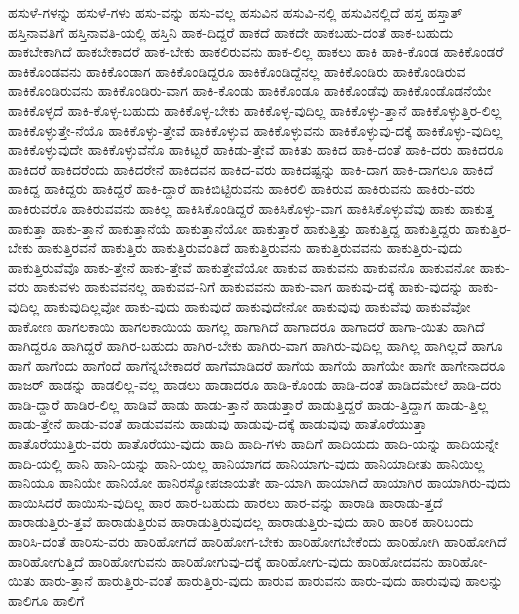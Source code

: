 {ಹಸುಳೆ-ಗಳನ್ನು
ಹಸುಳೆ-ಗಳು
ಹಸು-ವನ್ನು
ಹಸು-ವಲ್ಲ
ಹಸುವಿನ
ಹಸುವಿ-ನಲ್ಲಿ
ಹಸುವಿನಲ್ಲಿದೆ
ಹಸ್ತ
ಹಸ್ತಾತ್
ಹಸ್ತಿನಾವತಿಗೆ
ಹಸ್ತಿನಾವತಿ-ಯಲ್ಲಿ
ಹಸ್ತಿನಿ
ಹಾಕ-ದಿದ್ದರೆ
ಹಾಕದೆ
ಹಾಕದೇ
ಹಾಕಬಹು-ದಂತೆ
ಹಾಕ-ಬಹುದು
ಹಾಕಬೇಕಾಗಿದೆ
ಹಾಕಬೇಕಾದರೆ
ಹಾಕ-ಬೇಕು
ಹಾಕಲಿರುವನು
ಹಾಕ-ಲಿಲ್ಲ
ಹಾಕಲು
ಹಾಕಿ
ಹಾಕಿ-ಕೊಂಡ
ಹಾಕಿಕೊಂಡರೆ
ಹಾಕಿಕೊಂಡವನು
ಹಾಕಿಕೊಂಡಾಗ
ಹಾಕಿಕೊಂಡಿದ್ದರೂ
ಹಾಕಿಕೊಂಡಿದ್ದೆನಲ್ಲ
ಹಾಕಿಕೊಂಡಿರು
ಹಾಕಿಕೊಂಡಿರುವ
ಹಾಕಿಕೊಂಡಿರುವನು
ಹಾಕಿಕೊಂಡಿರು-ವಾಗ
ಹಾಕಿ-ಕೊಂಡು
ಹಾಕಿಕೊಂಡೂ
ಹಾಕಿಕೊಂಡೆವು
ಹಾಕಿಕೊಂಡೊಡನೆಯೇ
ಹಾಕಿಕೊಳ್ಳದೆ
ಹಾಕಿ-ಕೊಳ್ಳ-ಬಹುದು
ಹಾಕಿಕೊಳ್ಳ-ಬೇಕು
ಹಾಕಿಕೊಳ್ಳ-ವುದಿಲ್ಲ
ಹಾಕಿಕೊಳ್ಳು-ತ್ತಾನೆ
ಹಾಕಿಕೊಳ್ಳುತ್ತಿರ-ಲಿಲ್ಲ
ಹಾಕಿಕೊಳ್ಳುತ್ತೇ-ನೆಯೊ
ಹಾಕಿಕೊಳ್ಳು-ತ್ತೇವೆ
ಹಾಕಿಕೊಳ್ಳುವ
ಹಾಕಿಕೊಳ್ಳುವನು
ಹಾಕಿಕೊಳ್ಳುವು-ದಕ್ಕೆ
ಹಾಕಿಕೊಳ್ಳು-ವುದಿಲ್ಲ
ಹಾಕಿಕೊಳ್ಳುವುದೇ
ಹಾಕಿಕೊಳ್ಳುವೆನೊ
ಹಾಕಿಟ್ಟರೆ
ಹಾಕಿಡು-ತ್ತೇವೆ
ಹಾಕಿತು
ಹಾಕಿದ
ಹಾಕಿ-ದಂತೆ
ಹಾಕಿ-ದರು
ಹಾಕಿದರೂ
ಹಾಕಿದರೆ
ಹಾಕಿದರೆಂದು
ಹಾಕಿದರೇನೆ
ಹಾಕಿದವನ
ಹಾಕಿದ-ವರು
ಹಾಕಿದಷ್ಟನ್ನು
ಹಾಕಿ-ದಾಗ
ಹಾಕಿ-ದಾಗಲೂ
ಹಾಕಿದೆ
ಹಾಕಿದ್ದ
ಹಾಕಿದ್ದರು
ಹಾಕಿದ್ದರೆ
ಹಾಕಿ-ದ್ದಾರೆ
ಹಾಕಿಬಿಟ್ಟಿರುವನು
ಹಾಕಿರಲಿ
ಹಾಕಿರುವ
ಹಾಕಿರುವನು
ಹಾಕಿರು-ವರು
ಹಾಕಿರುವರೊ
ಹಾಕಿರುವವನು
ಹಾಕಿಲ್ಲ
ಹಾಕಿಸಿಕೊಂಡಿದ್ದರೆ
ಹಾಕಿಸಿಕೊಳ್ಳು-ವಾಗ
ಹಾಕಿಸಿಕೊಳ್ಳುವೆವು
ಹಾಕು
ಹಾಕುತ್ತ
ಹಾಕುತ್ತಾ
ಹಾಕು-ತ್ತಾನೆ
ಹಾಕುತ್ತಾನೆಯೆ
ಹಾಕುತ್ತಾನೆಯೋ
ಹಾಕುತ್ತಾರೆ
ಹಾಕುತ್ತಿತ್ತು
ಹಾಕುತ್ತಿದ್ದ
ಹಾಕುತ್ತಿದ್ದರು
ಹಾಕುತ್ತಿರ-ಬೇಕು
ಹಾಕುತ್ತಿರವನೆ
ಹಾಕುತ್ತಿರು
ಹಾಕುತ್ತಿರುವಂತಿದೆ
ಹಾಕುತ್ತಿರುವನು
ಹಾಕುತ್ತಿರುವವನು
ಹಾಕುತ್ತಿರು-ವುದು
ಹಾಕುತ್ತಿರುವೆವೊ
ಹಾಕು-ತ್ತೇನೆ
ಹಾಕು-ತ್ತೇವೆ
ಹಾಕುತ್ತೇವೆಯೋ
ಹಾಕುವ
ಹಾಕುವನು
ಹಾಕುವನೊ
ಹಾಕುವನೋ
ಹಾಕು-ವರು
ಹಾಕುವಳು
ಹಾಕುವವನಲ್ಲ
ಹಾಕುವವ-ನಿಗೆ
ಹಾಕುವವನು
ಹಾಕು-ವಾಗ
ಹಾಕುವು-ದಕ್ಕೆ
ಹಾಕು-ವುದನ್ನು
ಹಾಕು-ವುದಿಲ್ಲ
ಹಾಕುವುದಿಲ್ಲವೋ
ಹಾಕು-ವುದು
ಹಾಕುವುದೆ
ಹಾಕುವುದೇನೋ
ಹಾಕುವುವು
ಹಾಕುವೆವು
ಹಾಕುವೆವೋ
ಹಾಕೋಣ
ಹಾಗಲಕಾಯಿ
ಹಾಗಲಕಾಯಿಯ
ಹಾಗಲ್ಲ
ಹಾಗಾಗಿದೆ
ಹಾಗಾದರೂ
ಹಾಗಾದರೆ
ಹಾಗಾ-ಯಿತು
ಹಾಗಿದೆ
ಹಾಗಿದ್ದರೂ
ಹಾಗಿದ್ದರೆ
ಹಾಗಿರ-ಬಹುದು
ಹಾಗಿರ-ಬೇಕು
ಹಾಗಿರು-ವಾಗ
ಹಾಗಿರು-ವುದಿಲ್ಲ
ಹಾಗಿಲ್ಲ
ಹಾಗಿಲ್ಲದೆ
ಹಾಗೂ
ಹಾಗೆ
ಹಾಗೆಂದು
ಹಾಗೆಂದೆ
ಹಾಗೆನ್ನಬೇಕಾದರೆ
ಹಾಗೆಮಾಡಿದರೆ
ಹಾಗೆಯ
ಹಾಗೆಯೆ
ಹಾಗೆಯೇ
ಹಾಗೇ
ಹಾಗೇನಾದರೂ
ಹಾಜರ್
ಹಾಡನ್ನು
ಹಾಡಲಿಲ್ಲ-ವಲ್ಲ
ಹಾಡಲು
ಹಾಡಾದರೂ
ಹಾಡಿ-ಕೊಂಡು
ಹಾಡಿ-ದಂತೆ
ಹಾಡಿದಮೇಲೆ
ಹಾಡಿ-ದರು
ಹಾಡಿ-ದ್ದಾರೆ
ಹಾಡಿರ-ಲಿಲ್ಲ
ಹಾಡಿವೆ
ಹಾಡು
ಹಾಡು-ತ್ತಾನೆ
ಹಾಡುತ್ತಾರೆ
ಹಾಡುತ್ತಿದ್ದರೆ
ಹಾಡು-ತ್ತಿದ್ದಾಗ
ಹಾಡು-ತ್ತಿಲ್ಲ
ಹಾಡು-ತ್ತೇನೆ
ಹಾಡು-ವಂತೆ
ಹಾಡುವವನು
ಹಾಡುವು
ಹಾಡುವು-ದಕ್ಕೆ
ಹಾಡುವುವು
ಹಾತೊರೆಯುತ್ತಾ
ಹಾತೊರೆಯುತ್ತಿರು-ವರು
ಹಾತೊರೆಯು-ವುದು
ಹಾದಿ
ಹಾದಿ-ಗಳು
ಹಾದಿಗೆ
ಹಾದಿಯದು
ಹಾದಿ-ಯನ್ನು
ಹಾದಿಯನ್ನೇ
ಹಾದಿ-ಯಲ್ಲಿ
ಹಾನಿ
ಹಾನಿ-ಯನ್ನು
ಹಾನಿ-ಯಲ್ಲ
ಹಾನಿಯಾಗದ
ಹಾನಿಯಾಗು-ವುದು
ಹಾನಿಯಾದೀತು
ಹಾನಿಯಿಲ್ಲ
ಹಾನಿಯೂ
ಹಾನಿಯೇ
ಹಾನಿಯೋ
ಹಾನಿರಸ್ಯೋಪಜಾಯತೇ
ಹಾ-ಯಾಗಿ
ಹಾಯಾಗಿದೆ
ಹಾಯಾಗಿರ
ಹಾಯಾಗಿರು-ವುದು
ಹಾಯಿಸಿದರೆ
ಹಾಯಿಸು-ವುದಿಲ್ಲ
ಹಾರ
ಹಾರ-ಬಹುದು
ಹಾರಲು
ಹಾರ-ವನ್ನು
ಹಾರಾಡಿ
ಹಾರಾಡು-ತ್ತದೆ
ಹಾರಾಡುತ್ತಿರು-ತ್ತವೆ
ಹಾರಾಡುತ್ತಿರುವ
ಹಾರಾಡುತ್ತಿರುವುದಲ್ಲ
ಹಾರಾಡುತ್ತಿರು-ವುದು
ಹಾರಿ
ಹಾರಿಕ
ಹಾರಿಬಂದು
ಹಾರಿಸಿ-ದಂತೆ
ಹಾರಿಸು-ವರು
ಹಾರಿಹೋಗದೆ
ಹಾರಿಹೋಗ-ಬೇಕು
ಹಾರಿಹೋಗಬೇಕೆಂದು
ಹಾರಿಹೋಗಿ
ಹಾರಿಹೋಗಿದೆ
ಹಾರಿಹೋಗುತ್ತಿದೆ
ಹಾರಿಹೋಗುವನು
ಹಾರಿಹೋಗುವು-ದಕ್ಕೆ
ಹಾರಿಹೋಗು-ವುದು
ಹಾರಿಹೋದವನು
ಹಾರಿಹೋ-ಯಿತು
ಹಾರು-ತ್ತಾನೆ
ಹಾರುತ್ತಿರು-ವಂತೆ
ಹಾರುತ್ತಿರು-ವುದು
ಹಾರುವ
ಹಾರುವನು
ಹಾರು-ವುದು
ಹಾರುವುವು
ಹಾಲನ್ನು
ಹಾಲಿಗೂ
ಹಾಲಿಗೆ
}
